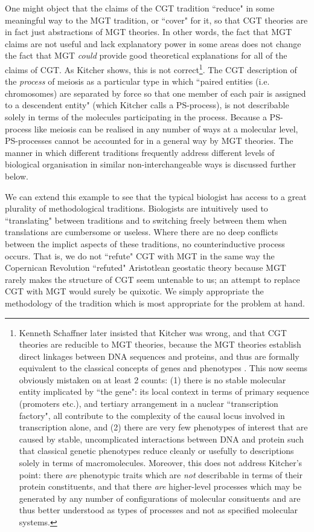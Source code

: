 One might object that the claims of the CGT tradition ``reduce" in some meaningful way to the MGT tradition, or ``cover" for it, so that CGT theories are in fact just abstractions of MGT theories. In other words, the fact that MGT claims are not useful and lack explanatory power in some areas does not change the fact that MGT \textit{could} provide good theoretical explanations for all of the claims of CGT. As Kitcher shows, this is not correct\footnote{Kenneth Schaffner later insisted that Kitcher was wrong, and that CGT theories are reducible to MGT theories, because the MGT theories establish direct linkages between DNA sequences and proteins, and thus are formally equivalent to the classical concepts of genes and phenotypes \cite{Schaffner1993}. This now seems obviously mistaken on at least 2 counts: (1) there is no stable molecular entity implicated by ``the gene": its local context in terms of primary sequence (promoters etc.), and tertiary arrangement in a nuclear ``transcription factory", all contribute to the complexity of the causal locus involved in transcription alone, and (2) there are very few phenotypes of interest that are caused by stable, uncomplicated interactions between DNA and protein such that classical genetic phenotypes reduce cleanly or usefully to descriptions solely in terms of macromolecules. Moreover, this does not address Kitcher's point: there \textit{are} phenotypic traits which are \textit{not} describable in terms of their protein constituents, and that there \textit{are} higher-level processes which may be generated by any number of configurations of molecular consituents and are thus better understood as types of processes and not as specified molecular systems.}. The CGT description of the \textit{process} of meiosis as a particular type in which ``paired entities (i.e. chromosomes) are separated by force so that one member of each pair is assigned to a descendent entity"\cite[p. 349]{Kitcher1984} (which Kitcher calls a PS-process), is not describable solely in terms of the molecules participating in the process. Because a PS-process like meiosis can be realised in any number of ways at a molecular level, PS-processes cannot be accounted for in a general way by MGT theories. The manner in which different traditions frequently address different levels of biological organisation in similar non-interchangeable ways is discussed further below.

We can extend this example to see that the typical biologist has access to a great plurality of methodological traditions. Biologists are intuitively used to ``translating" between traditions and to switching freely between them when translations are cumbersome or useless. Where there are no deep conflicts between the implict aspects of these traditions, no counterinductive process occurs. That is, we do not ``refute" CGT with MGT in the same way the Copernican Revolution ``refuted" Aristotlean geostatic theory because MGT rarely makes the structure of CGT seem untenable to us; an attempt to replace CGT with MGT would surely be quixotic. We simply appropriate the methodology of the tradition which is most appropriate for the problem at hand.

